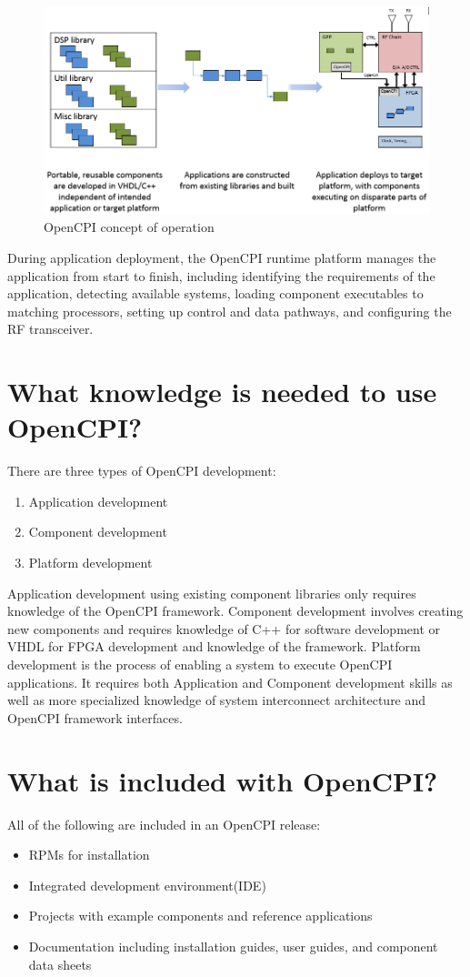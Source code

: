\begin{figure}[ht]
        \centering
        \includegraphics[scale=0.5]{./figures/concept_of_operation.png}
        \caption{OpenCPI concept of operation}
        \label{fig:con_op}
\end{figure}
During application deployment, the OpenCPI runtime platform manages the application from start to finish, including identifying the requirements of the application, detecting available systems, loading component executables to matching processors, setting up control and data pathways, and configuring the RF transceiver.
\section*{What knowledge is needed to use OpenCPI?}
There are three types of OpenCPI development:
\begin{enumerate}
\item Application development
\item Component development
\item Platform development
\end{enumerate}

Application development using existing component libraries only requires knowledge of the OpenCPI framework. Component development involves creating new components and requires knowledge of C++ for software development or VHDL for FPGA development and knowledge of the framework. Platform development is the process of enabling a system to execute OpenCPI applications. It requires both Application and Component development skills as well as more specialized knowledge of system interconnect architecture and OpenCPI framework interfaces.

\section*{What is included with OpenCPI?}
All of the following are included in an OpenCPI release:
\begin{itemize}
\item RPMs for installation
\item Integrated development environment(IDE)
\item Projects with example components and reference applications
\item Documentation including installation guides, user guides, and component data sheets
\end{itemize}


